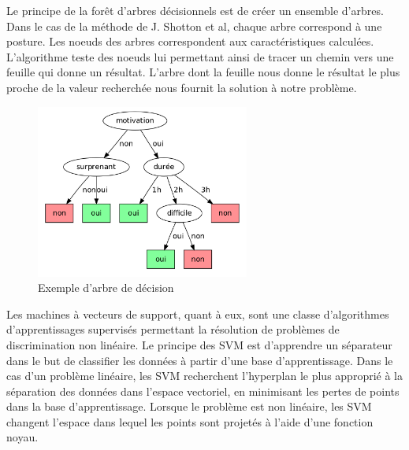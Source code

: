 Le principe de la forêt d'arbres décisionnels\cite{randomDecisionForest} est de créer un ensemble d'arbres.
Dans le cas de la méthode de J. Shotton et al\cite{kinectSegmentation}, chaque arbre correspond à une posture.
Les noeuds des arbres correspondent aux caractéristiques calculées. L'algorithme teste des noeuds lui permettant ainsi de tracer un
chemin vers une feuille qui donne un résultat. L'arbre dont la feuille nous donne le résultat le plus proche 
de la valeur recherchée nous fournit la solution à notre problème.\\

\begin{figure}[!ht]
  \begin{center}
    \includegraphics[width=7cm]{image/randomForest.png}
    \caption{Exemple d'arbre de décision}
  \end{center}
\end{figure}

Les machines à vecteurs de support\cite{SVM}, quant à eux, sont une classe d'algorithmes d'apprentissages supervisés permettant la
résolution de 
problèmes de discrimination non linéaire. Le principe des SVM est d'apprendre un séparateur dans le but de classifier les données à partir
d'une base d'apprentissage. Dans le cas d'un problème linéaire, les SVM recherchent l'hyperplan le plus approprié à la séparation des données
dans l'espace vectoriel, en minimisant les pertes de points dans la base d'apprentissage. Lorsque le problème est non linéaire,
les SVM changent l'espace dans lequel les points sont projetés à l'aide d'une fonction noyau.

